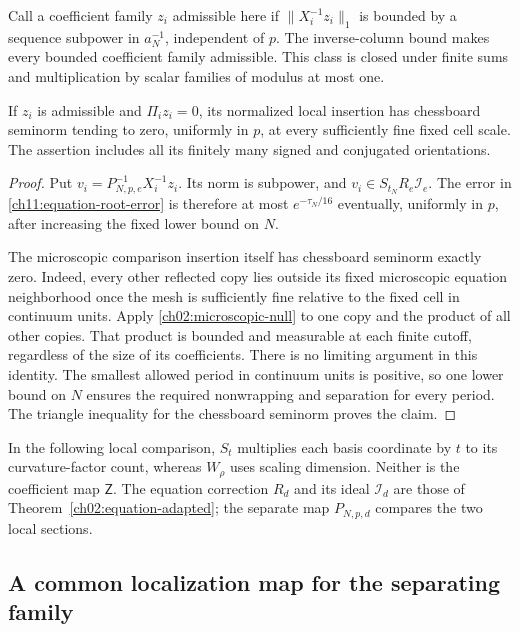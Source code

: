 Call a coefficient family $z_i$ admissible here if
$\|X_i^{-1}z_i\|_1$ is bounded by a sequence subpower in $a_N^{-1}$,
independent of $p$. The inverse-column bound makes every bounded
coefficient family admissible. This class is closed under finite sums
and multiplication by scalar families of modulus at most one.

\begin{lemma}
\label{ch11:uniform-sweep}
If $z_i$ is admissible and $\Pi_i z_i=0$, its normalized local insertion
has chessboard seminorm tending to zero, uniformly in $p$, at every
sufficiently fine fixed cell scale. The assertion includes all its
finitely many signed and conjugated orientations.
\end{lemma}
\begin{proof}
Put $v_i=P_{N,p,e}^{-1}X_i^{-1}z_i$.
Its norm is subpower, and $v_i\in S_{t_N}R_e\mathcal I_e$.
The error in \eqref{ch11:equation-root-error} is therefore at most
$e^{-\tau_N/16}$ eventually, uniformly in $p$, after increasing
the fixed lower bound on $N$.

The microscopic comparison insertion itself has chessboard seminorm exactly
zero. Indeed, every other reflected copy lies outside its fixed
microscopic equation neighborhood once the mesh is sufficiently
fine relative to the fixed cell in continuum units. Apply
\eqref{ch02:microscopic-null} to one copy and the product of all
other copies. That product is bounded and measurable at each
finite cutoff, regardless of the size of its coefficients.
There is no limiting argument in this identity.
The smallest allowed period in continuum units is positive, so one lower bound
on $N$ ensures the required nonwrapping and separation for
every period. The triangle inequality for the chessboard seminorm proves the claim.
\end{proof}

In the following local comparison, $S_t$ multiplies each basis
coordinate by $t$ to its curvature-factor count, whereas $W_\rho$
uses scaling dimension. Neither is the coefficient map $\mathsf Z$.
The equation correction $R_d$ and its ideal $\mathcal I_d$ are
those of Theorem~\ref{ch02:equation-adapted}; the separate map
$P_{N,p,d}$ compares the two local sections.

\subsection{A common localization map for the separating family}
\label{ch11:common-extraction}

